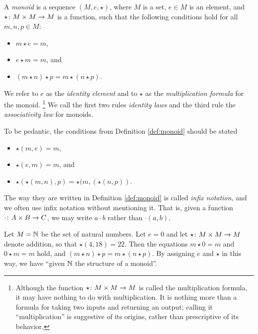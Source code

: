 \begin{definitionENG}[Monoid]\label{def:monoid}
A {\em monoid} is a sequence $(M,e,\star)$, where $M$ is a set, $e\in M$ is an element, and $\star\colon M\times M\rightarrow M$ is a function, such that the following conditions hold for all $m,n,p\in M$:
\begin{itemize}
\item $m\star e=m$,
\item $e\star m=m$, and
\item $(m\star n)\star p=m\star(n\star p)$.
\end{itemize}
We refer to $e$ as the {\em identity element} and to $\star$ as the {\em multiplication formula} for the monoid.
\footnote{Although the function $\star\colon M\times M\rightarrow M$ is called the multiplication formula, it may have nothing to do with multiplication. It is nothing more than a formula for taking two inputs and returning an output; calling it “multiplication” is suggestive of its origins, rather than prescriptive of its behavior.} 
We call the first two rules {\em identity laws} and the third rule the {\em associativity law} for monoids. 
\end{definitionENG}

\begin{definitionRUS}[Monoid]\label{def:monoid}
\end{definitionRUS}

\begin{remarkENG}
To be pedantic, the conditions from Definition \ref{def:monoid} should be stated 
\begin{itemize}
\item $\star(m,e)=m$,
\item $\star(e,m)=m$, and 
\item $\star(\star(m,n),p)=\star(m,(\star(n,p))$.
\end{itemize} The way they are written in Definition \ref{def:monoid} is called {\em infix notation}, and we often use infix notation without mentioning it. That is, given a function $\cdot\colon A\times B\rightarrow C$, we may write $a\cdot b$ rather than $\cdot(a,b)$.
\end{remarkENG}

\begin{remarkRUS}
\end{remarkRUS}

\begin{exampleENG}\label{ex:monoid 0}
Let $M={\mathbb N}$ be the set of natural numbers. Let $e=0$ and let $\star\colon M\times M\rightarrow M$ denote addition, so that $\star(4,18)=22$. Then the equations $m\star 0=m$ and $0\star m=m$ hold, and $(m\star n)\star p=m\star (n\star p)$. By assigning $e$ and $\star$ in this way, we have “given ${\mathbb N}$ the structure of a monoid”.
\end{exampleENG}

